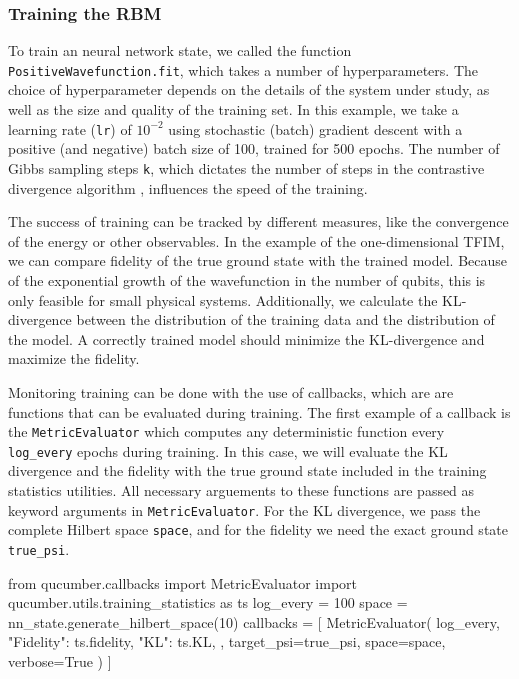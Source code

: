 \documentclass[submission, Phys]{SciPost}
\begin{document}
\subsubsection{Training the RBM}

To train an neural network state, we called the function \verb|PositiveWavefunction.fit|, which takes a number of hyperparameters.
The choice of hyperparameter depends on the details of the system under study, as well as the size and quality of the training set.
In this example, we take a learning rate (\verb|lr|) of $10^{-2}$ using stochastic (batch) gradient descent with a positive (and negative) batch size of 100, trained for 500 epochs.
The number of Gibbs sampling steps \verb|k|, which dictates the number of steps in the contrastive divergence algorithm \cite{hinton2002training},
influences the speed of the training. 


The success of training can be tracked by different measures, like the convergence of the energy or other observables.
In the example of the one-dimensional TFIM, we can compare fidelity of the true ground state with the trained model.
Because of the exponential growth of the wavefunction in the number of qubits, this is only feasible for small physical systems.
Additionally, we calculate the KL-divergence between the distribution of the training data and the distribution of the model.
A correctly trained model should minimize the KL-divergence and maximize the fidelity.

Monitoring training can be done with the use of callbacks, which are are functions that can be evaluated during training.
The first example of a callback is the \verb|MetricEvaluator| which computes any deterministic function every \verb|log_every| epochs during training.
 In this case, we will evaluate the KL divergence and the fidelity with the true ground state included in the training statistics utilities. 
 All necessary arguements to these functions are passed as keyword arguments in \verb|MetricEvaluator|. For the KL divergence, we pass the complete Hilbert space \verb|space|, and for the fidelity we need the exact ground state \verb|true_psi|. 
\begin{python}
from qucumber.callbacks import MetricEvaluator
import qucumber.utils.training_statistics as ts
log_every = 100
space = nn_state.generate_hilbert_space(10)
callbacks = [
    MetricEvaluator(
        log_every,
        {
        "Fidelity": ts.fidelity, 
        "KL": ts.KL, 
        },
    target_psi=true_psi,
    space=space,
    verbose=True
    )
]
\end{python}
\end{document}
